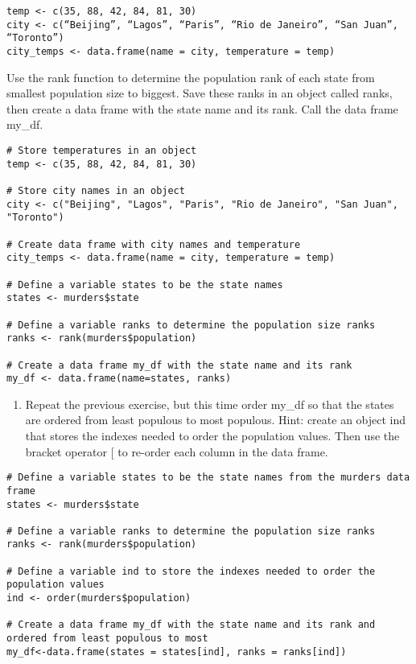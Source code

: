 \documentclass[
]{article}
\providecommand{\tightlist}{%
  \setlength{\itemsep}{0pt}\setlength{\parskip}{0pt}}
\begin{document}
\begin{verbatim}
temp <- c(35, 88, 42, 84, 81, 30)
city <- c(“Beijing”, “Lagos”, “Paris”, “Rio de Janeiro”, “San Juan”, “Toronto”)
city_temps <- data.frame(name = city, temperature = temp)
\end{verbatim}

Use the rank function to determine the population rank of each state
from smallest population size to biggest. Save these ranks in an object
called ranks, then create a data frame with the state name and its rank.
Call the data frame my\_df.

\begin{verbatim}
# Store temperatures in an object 
temp <- c(35, 88, 42, 84, 81, 30)

# Store city names in an object 
city <- c("Beijing", "Lagos", "Paris", "Rio de Janeiro", "San Juan", "Toronto")

# Create data frame with city names and temperature 
city_temps <- data.frame(name = city, temperature = temp)

# Define a variable states to be the state names 
states <- murders$state

# Define a variable ranks to determine the population size ranks 
ranks <- rank(murders$population)

# Create a data frame my_df with the state name and its rank
my_df <- data.frame(name=states, ranks)
\end{verbatim}

\begin{enumerate}
\def\labelenumi{\arabic{enumi}.}
\setcounter{enumi}{5}
\tightlist
\item
  Repeat the previous exercise, but this time order my\_df so that the
  states are ordered from least populous to most populous. Hint: create
  an object ind that stores the indexes needed to order the population
  values. Then use the bracket operator {[} to re-order each column in
  the data frame.
\end{enumerate}

\begin{verbatim}
# Define a variable states to be the state names from the murders data frame
states <- murders$state

# Define a variable ranks to determine the population size ranks 
ranks <- rank(murders$population)

# Define a variable ind to store the indexes needed to order the population values
ind <- order(murders$population)

# Create a data frame my_df with the state name and its rank and ordered from least populous to most 
my_df<-data.frame(states = states[ind], ranks = ranks[ind])
\end{verbatim}
\end{document}
